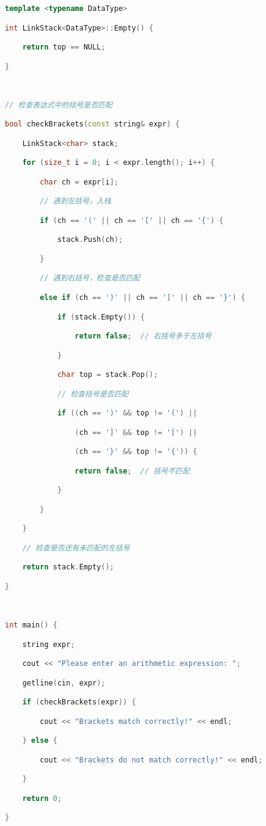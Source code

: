 \begin{lstlisting}[language=C++]
template <typename DataType>

int LinkStack<DataType>::Empty() {

    return top == NULL;

}

  

// 检查表达式中的括号是否匹配

bool checkBrackets(const string& expr) {

    LinkStack<char> stack;

    for (size_t i = 0; i < expr.length(); i++) {

        char ch = expr[i];

        // 遇到左括号，入栈

        if (ch == '(' || ch == '[' || ch == '{') {

            stack.Push(ch);

        }

        // 遇到右括号，检查是否匹配

        else if (ch == ')' || ch == ']' || ch == '}') {

            if (stack.Empty()) {

                return false;  // 右括号多于左括号

            }

            char top = stack.Pop();

            // 检查括号是否匹配

            if ((ch == ')' && top != '(') ||

                (ch == ']' && top != '[') ||

                (ch == '}' && top != '{')) {

                return false;  // 括号不匹配

            }

        }

    }

    // 检查是否还有未匹配的左括号

    return stack.Empty();

}

  

int main() {

    string expr;

    cout << "Please enter an arithmetic expression: ";

    getline(cin, expr);

    if (checkBrackets(expr)) {

        cout << "Brackets match correctly!" << endl;

    } else {

        cout << "Brackets do not match correctly!" << endl;

    }

    return 0;

}
\end{lstlisting}
